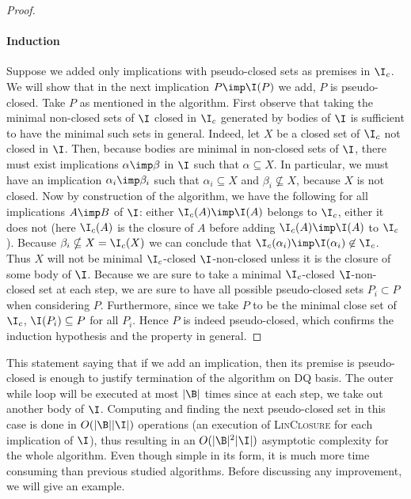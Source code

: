 \begin{proof}
	\paragraph{Induction} Suppose we added only implications with pseudo-closed 
	sets as premises in $\I_c$. We will show that in the next implication $P 
	\imp 
	\I(P)$ we add, $P$ is pseudo-closed. Take $P$ as mentioned in the algorithm.
	First observe that taking the minimal non-closed sets of $\I$ closed in 
	$\I_c$
	generated by bodies of $\I$ is sufficient to have the minimal such sets in 
	general. Indeed, let $X$ be a closed set of $\I_c$ not closed in $\I$. Then,
	because bodies are minimal in non-closed sets of $\I$, there must exist 
	implications $\alpha \imp \beta$ in $\I$ such that $\alpha \subseteq X$.
	In particular, we must have an implication $\alpha_i \imp \beta_i$ such 
	that 
	$\alpha_i \subseteq X$ and $\beta_i \nsubseteq X$, because $X$ is not 
	closed. 
	Now by construction of the algorithm, we have the following for all 
	implications $A \imp B$ of $\I$: either $\I_c(A) \imp \I(A)$ belongs to 
	$\I_c$, 
	either it does not (here $\I_c(A)$ is the closure of $A$ before adding 
	$\I_c(A) \imp \I(A)$ to $\I_c$). Because $\beta_i \nsubseteq X = 
	\I_c(X)$ we can conclude that $\I_c(\alpha_i) \imp \I(\alpha_i) \not\in 
	\I_c$.
	Thus $X$ will not be minimal $\I_c$-closed $\I$-non-closed unless it is the 
	closure of some body of $\I$.
	Because we are sure to take a minimal $\I_c$-closed $\I$-non-closed set at 
	each step, we are sure to have all possible pseudo-closed sets $P_i \subset 
	P$
	when considering $P$. Furthermore, since we take $P$ to be the minimal close
	set of $\I_c$, $\I(P_i) \subseteq P$ for all $P_i$. Hence $P$ is indeed 
	pseudo-closed, which confirms the induction hypothesis and the property in
	general.
	
\end{proof}

This statement saying that if we add an implication, then its premise is 
pseudo-closed is enough to justify termination of the algorithm on DQ
basis. The outer while loop will be executed at most $|\B|$ times since at
each step, we take out another body of $\I$. Computing and finding the next
pseudo-closed set in this case is done in $O(|\B||\I|)$ operations (an 
execution of \textsc{LinClosure} for each implication of $\I$), thus resulting
in an $O(|\B|^2|\I|)$ asymptotic complexity for the whole algorithm. Even though
simple in its form, it is much more time consuming than previous studied 
algorithms. Before discussing any improvement, we will give an example.

